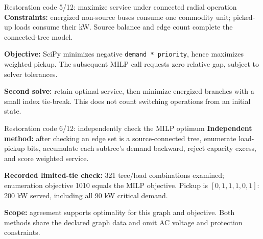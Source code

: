 \begin{frame}[t]{Restoration code 5/12: maximize service under connected radial operation}
\deepdive
{}
\footnotesize
\textbf{Constraints:} energized non-source buses consume one commodity unit; picked-up loads consume their kW. Source balance and edge count complete the connected-tree model.
\par\smallskip\textbf{Objective:} SciPy minimizes negative \texttt{demand * priority}, hence maximizes weighted pickup. The subsequent MILP call requests zero relative gap, subject to solver tolerances.
\par\smallskip\textbf{Second solve:} retain optimal service, then minimize energized branches with a small index tie-break. This does not count switching operations from an initial state.
\end{frame}

\begin{frame}[t]{Restoration code 6/12: independently check the MILP optimum}
\deepdive
{}
\footnotesize
\textbf{Independent method:} after checking an edge set is a source-connected tree, enumerate load-pickup bits, accumulate each subtree's demand backward, reject capacity excess, and score weighted service.
\par\smallskip\textbf{Recorded limited-tie check:} 321 tree/load combinations examined; enumeration objective 1010 equals the MILP objective. Pickup is $[0,1,1,1,0,1]$: 200 kW served, including all 90 kW critical demand.
\par\smallskip\textbf{Scope:} agreement supports optimality for this graph and objective. Both methods share the declared graph data and omit AC voltage and protection constraints.
\end{frame}

